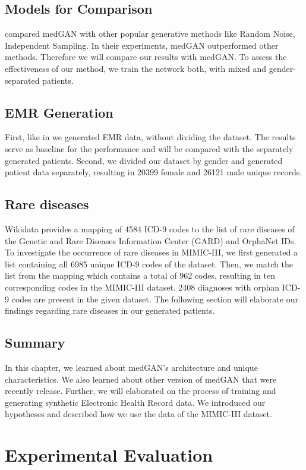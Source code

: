 \documentclass[11pt, a4paper, oneside]{book}
\begin{document}
\section{Models for Comparison}
\citep{Choi2017} compared medGAN with other popular generative methods like Random Noise, Independent Sampling. In their experiments, medGAN outperformed other methods. Therefore we will compare our results with medGAN. To assess the effectiveness of our method, we train the network both, with mixed and gender-separated patients. 

\section{EMR Generation}
First, like in \citep{Choi2017} we generated EMR data, without dividing the dataset. The results serve as baseline for the performance and will be compared with the separately generated patients.
Second, we divided our dataset by gender and generated patient data separately, resulting in 20399 female and 26121 male unique records.
\\
\section{Rare diseases}
Wikidata provides a mapping of 4584 ICD-9 codes to the list of rare diseases of the Genetic and Rare Diseases Information Center (GARD) and OrphaNet IDs.
To investigate the occurrence of rare diseases in MIMIC-III, we first generated a list containing all 6985 unique ICD-9 codes of the dataset. Then, we match the list from the mapping which contains a total of 962 codes, resulting in ten corresponding codes in the MIMIC-III dataset. 2408 diagnoses with orphan ICD-9 codes are present in the given dataset.
The following section will elaborate our findings regarding rare diseases in our generated patients.
\section{Summary}
In this chapter, we learned about medGAN's architecture and unique characteristics. We also learned about other version of medGAN that were recently release. Further, we will elaborated on the process of training and generating synthetic Electronic Health Record data. We introduced our hypotheses and described how we use the data of the MIMIC-III dataset.

\chapter{Experimental Evaluation}
\end{document}
